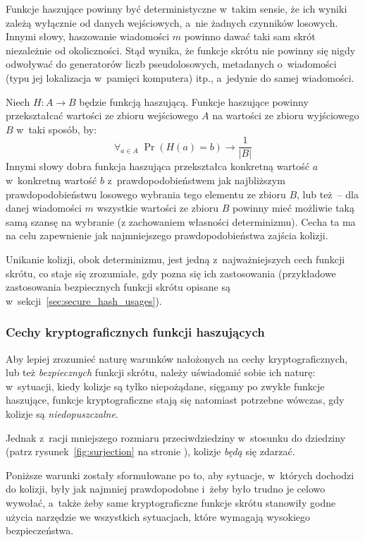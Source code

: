 Funkcje haszujące powinny być deterministyczne w~takim sensie, że ich wyniki
zależą wyłącznie od danych wejściowych, a~nie żadnych czynników losowych.
Innymi słowy, haszowanie wiadomości $m$ powinno dawać taki sam skrót
niezależnie od okoliczności. Stąd wynika, że funkcje skrótu nie powinny się
nigdy odwoływać do generatorów liczb pseudolosowych, metadanych o~wiadomości
(typu jej lokalizacja w~pamięci komputera) itp., a~jedynie do samej wiadomości.

Niech $H : A \to B$ będzie funkcją haszującą. Funkcje haszujące powinny
przekształcać wartości ze zbioru wejściowego $A$ na wartości ze zbioru
wyjściowego $B$ w~taki sposób, by:
\[
    \forall_{a \in A} \; \Pr(H(a) = b) \to \frac{1}{|B|}
\]
Innymi słowy dobra funkcja haszująca przekształca konkretną wartość $a$
w~konkretną wartość $b$ z~prawdopodobieństwem jak najbliższym
prawdopodobieństwu losowego wybrania tego elementu ze zbioru $B$, lub też~--
dla danej wiadomości $m$ wszystkie wartości ze zbioru $B$ powinny mieć możliwie
taką samą szansę na wybranie (z zachowaniem własności determinizmu). Cecha ta
ma na celu zapewnienie jak najmniejszego prawdopodobieństwa zajścia kolizji.

Unikanie kolizji, obok determinizmu, jest jedną z~najważniejszych cech funkcji
skrótu, co staje się zrozumiałe, gdy pozna się ich zastosowania (przykładowe
zastosowania bezpiecznych funkcji skrótu opisane są
w~sekcji~\ref{sec:secure_hash_usages}).



\subsubsection{Cechy kryptograficznych funkcji haszujących}
\label{sec:secure_hash_attributes}
Aby lepiej zrozumieć naturę warunków nałożonych na cechy kryptograficznych, lub
też \emph{bezpiecznych} funkcji skrótu, należy uświadomić sobie ich naturę:
w~sytuacji, kiedy kolizje są tylko niepożądane, sięgamy po zwykłe funkcje
haszujące, funkcje kryptograficzne stają się natomiast potrzebne wówczas, gdy
kolizje są \emph{niedopuszczalne}.

Jednak z~racji mniejszego rozmiaru przeciwdziedziny w~stosunku do dziedziny
(patrz rysunek~\ref{fig:surjection} na stronie \pageref{fig:surjection}),
kolizje \emph{będą} się zdarzać.

Poniższe warunki zostały sformułowane po to, aby sytuacje, w~których dochodzi
do kolizji, były jak najmniej prawdopodobne i~żeby było trudno je celowo
wywołać, a~także żeby same kryptograficzne funkcje skrótu stanowiły godne
użycia narzędzie we wszystkich sytuacjach, które wymagają wysokiego
bezpieczeństwa.

